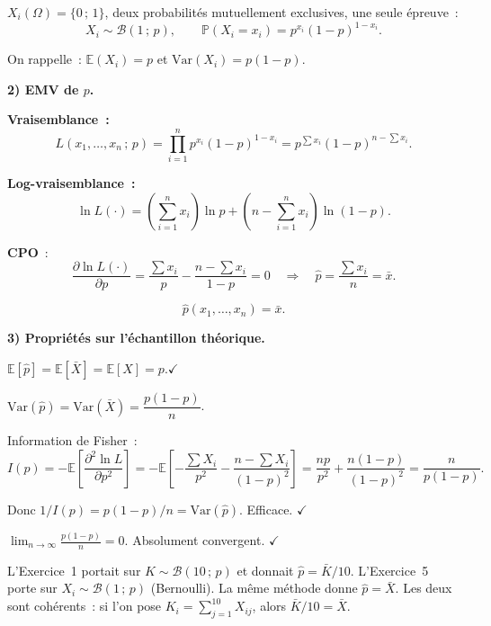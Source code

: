 \documentclass[11pt,a4paper]{article}
\newcommand{\B}{\mathcal{B}}
\newcommand{\E}{\mathbb{E}}
\newcommand{\Var}{\mathrm{Var}}
\newcommand{\Prob}{\mathbb{P}}
\renewcommand{\P}{\Prob}
\begin{document}
$X_i(\Omega)=\{0\,;\,1\}$, deux probabilit\'es mutuellement exclusives, une seule \'epreuve~:
$$X_i\sim\B(1\,;\,p), \qquad \P(X_i=x_i)=p^{x_i}(1-p)^{1-x_i}.$$

On rappelle~: $\E(X_i)=p$ et $\Var(X_i)=p(1-p)$.

\medskip
\textbf{2) EMV de $p$.}

\textbf{Vraisemblance~:}
$$L(x_1,\ldots,x_n\,;\,p)=\prod_{i=1}^n p^{x_i}(1-p)^{1-x_i}
  = p^{\sum x_i}(1-p)^{n-\sum x_i}.$$

\textbf{Log-vraisemblance~:}
$$\ln L(\cdot) = \left(\sum_{i=1}^n x_i\right)\ln p
  + \left(n-\sum_{i=1}^n x_i\right)\ln(1-p).$$

\textbf{CPO}~:
$$\frac{\partial\ln L(\cdot)}{\partial p}
  = \frac{\sum x_i}{p}-\frac{n-\sum x_i}{1-p}=0
  \quad\Longrightarrow\quad \hat p = \frac{\sum x_i}{n} = \bar x.$$

$$\boxed{\hat p(x_1,\ldots,x_n) = \bar x.}$$

\medskip
\textbf{3) Propri\'et\'es sur l'\'echantillon th\'eorique.}

\begin{demobox}
$\E[\hat p] = \E[\bar X] = \E[X] = p$.\quad $\checkmark$
\end{demobox}

\begin{demobox}[(b) Efficacit\'e]
$\Var(\hat p) = \Var(\bar X) = \dfrac{p(1-p)}{n}$.

Information de Fisher~:
$$I(p) = -\E\!\left[\frac{\partial^2\ln L}{\partial p^2}\right]
  = -\E\!\left[-\frac{\sum X_i}{p^2}-\frac{n-\sum X_i}{(1-p)^2}\right]
  = \frac{np}{p^2}+\frac{n(1-p)}{(1-p)^2} = \frac{n}{p(1-p)}.$$

Donc $1/I(p)=p(1-p)/n=\Var(\hat p)$. Efficace. $\checkmark$
\end{demobox}

\begin{demobox}[(c) Convergence]
$\displaystyle\lim_{n\to\infty}\frac{p(1-p)}{n}=0$. Absolument convergent. $\checkmark$
\end{demobox}

\begin{alertbox}
L'Exercice~1 portait sur $K\sim\B(10\,;\,p)$ et donnait $\hat p=\bar K/10$.
L'Exercice~5 porte sur $X_i\sim\B(1\,;\,p)$ (Bernoulli). La m\^eme m\'ethode donne $\hat p=\bar X$. Les deux sont coh\'erents~: si l'on pose $K_i=\sum_{j=1}^{10}X_{ij}$, alors $\bar K/10=\bar X$.
\end{alertbox}
\end{document}
